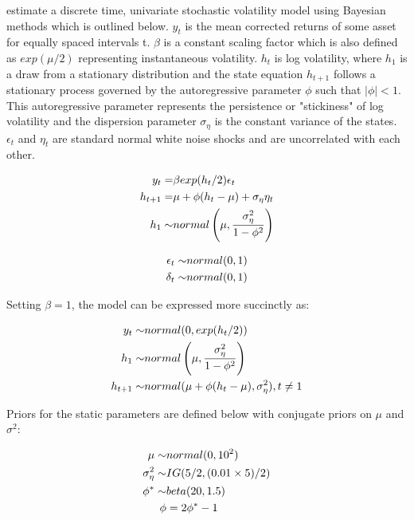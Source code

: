 \documentclass[12pt, a4paper]{article}
\begin{document}
        \citet{kim1998stochastic} estimate a discrete time, univariate stochastic volatility model using Bayesian methods which is outlined below. $y_t$ is the mean corrected returns of some asset for equally spaced intervals t. $\beta$ is a constant scaling factor which is also defined as $exp(\mu / 2)$ representing instantaneous volatility. $h_t$ is log volatility, where $h_1$ is a draw from a stationary distribution and the state equation $h_{t+1}$ follows a stationary process governed by the autoregressive parameter $\phi$ such that $|\phi|<1$. This autoregressive parameter represents the persistence or "stickiness" of log volatility and the dispersion parameter $\sigma_{\eta}$ is the constant variance of the states. $\epsilon_t$ and $\eta_t$ are standard normal white noise shocks and are uncorrelated with each other. 

        $$
        \begin{aligned}
        y_t =& \space \beta exp(h_t/2) \epsilon_t \\
        h_{t+1} =& \space \mu +\phi(h_t - \mu) + \sigma_{\eta} \eta_t  \\
        h_1 \sim& \space normal\left(\mu, \frac{\sigma_{\eta}^2}{1-\phi^2}\right) \\
        \end{aligned}
        $$


        $$
        \begin{aligned}
        \epsilon_t \sim& \space normal(0,1) \\
        \delta_t \sim& \space normal(0,1)
        \end{aligned}
        $$

        Setting $\beta=1$, the model can be expressed more succinctly as:

        $$
        \begin{aligned}
        y_t \sim& \space normal(0, exp(h_t/2)) \\ 
        h_1 \sim& \space normal \left(\mu, \frac{\sigma_{\eta}^2}{1-\phi^2}\right) \\
        h_{t+1} \sim& \space normal(\mu +\phi(h_t - \mu) , \sigma_{\eta}^2), \space\space t\neq 1\\ 
        \end{aligned}
        $$

        Priors for the static parameters are defined below with conjugate priors on $\mu$ and $\sigma^2$:

        $$
        \begin{aligned}
        \mu \sim& \space normal(0, 10^2) \\
        \sigma_{\eta}^2 \sim& \space IG(5/2, (0.01\times 5) / 2) \\
        \phi^{\ast} \sim& \space beta(20, 1.5) \\
        \phi &=  2\phi^{\ast} - 1
        \end{aligned}
        $$
\end{document}
